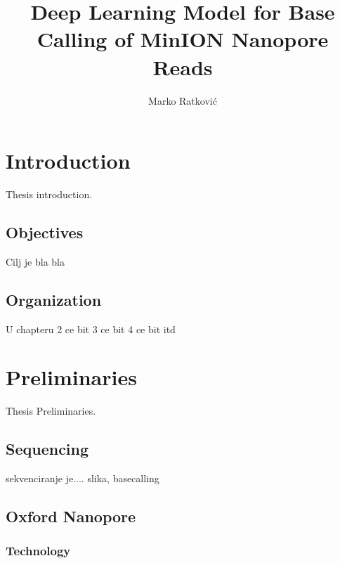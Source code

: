\documentclass[times, utf8, diplomski, english]{fer}
\begin{document}

\title{Deep Learning Model for Base Calling of MinION Nanopore Reads}

\author{Marko Ratković}

\maketitle

\izvornik


\tableofcontents

\chapter{Introduction}
Thesis introduction.

\section{Objectives}
Cilj je bla bla
\section{Organization}
U chapteru 2 ce bit
3 ce bit
4 ce bit
itd


\chapter{Preliminaries}
Thesis Preliminaries.

\section{Sequencing}
sekvenciranje je.... slika, basecalling

\section{Oxford Nanopore}

\subsection{Technology}
\end{document}
